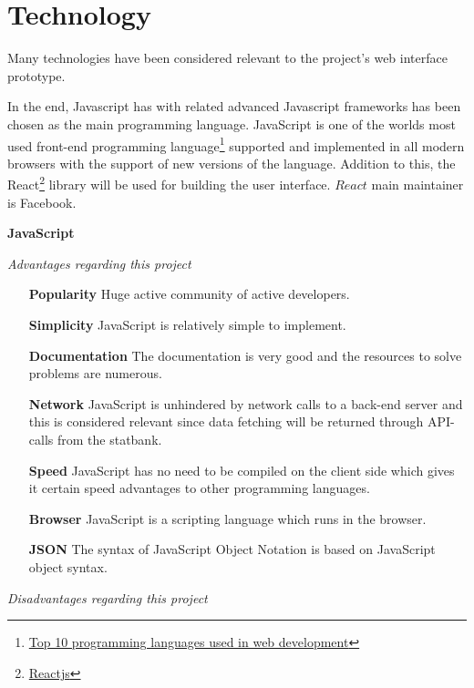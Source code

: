 \section{Technology}

Many technologies have been considered relevant to the project's web interface prototype.

In the end, Javascript has with related advanced Javascript frameworks has been chosen as the main programming language. JavaScript is one of the worlds most used front-end programming language\footnote{\href{http://blog.stoneriverelearning.com/top-10-programming-languages-used-in-web-development/}{Top 10 programming languages used in web development}\label{jstop10}} supported and implemented in all modern browsers with the support of new versions of the language. Addition to this, the React\footnote{\href{https://reactjs.org/}{Reactjs}\label{react}} library will be used for building the user interface. $React$ main maintainer is Facebook.

\bigskip
\centerline{\textbf{JavaScript}}
\medskip


\centerline{\textit{Advantages regarding this project}}

\begin{itemize}
\item [\textbf{Popularity}] Huge active community of active developers.
\item [\textbf{Simplicity}] JavaScript is relatively simple to implement.
\item [\textbf{Documentation}] The documentation is very good and the resources to solve problems are numerous.
\item [\textbf{Network}] JavaScript is unhindered by network calls to a back-end server and this is considered relevant since data fetching will be returned through API-calls from the statbank.
\item [\textbf{Speed}] JavaScript has no need to be compiled on the client side which gives it certain speed advantages to other programming languages.
\item [\textbf{Browser}] JavaScript is a scripting language which runs in the browser.
\item [\textbf{JSON}]The syntax of JavaScript Object Notation is based on JavaScript object syntax. 
\end{itemize}

\medskip

\centerline{\textit{Disadvantages regarding this project}}

